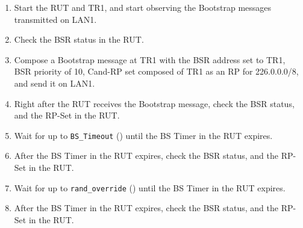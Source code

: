 \documentclass[11pt]{report}
\begin{document}

\begin{enumerate}

  \item Start the RUT and TR1, and start observing the Bootstrap messages
  transmitted on LAN1.

  \item Check the BSR status in the RUT.

  \item Compose a Bootstrap message at TR1 with the BSR address set to TR1,
  BSR priority of 10, Cand-RP set composed of TR1 as an RP for 226.0.0.0/8,
  and send it on LAN1.

  \item Right after the RUT receives the Bootstrap message, check the BSR
  status, and the RP-Set in the RUT.

  \item Wait for up to \verb=BS_Timeout= ({\PimsmBSTimeout}) until the BS
  Timer in the RUT expires.

  \item After the BS Timer in the RUT expires, check the BSR status, and the
  RP-Set in the RUT.

  \item Wait for up to \verb=rand_override= ({\PimsmRandOverride}) until the BS
  Timer in the RUT expires.

  \item After the BS Timer in the RUT expires, check the BSR status, and the
  RP-Set in the RUT.

\end{enumerate}

\end{document}
